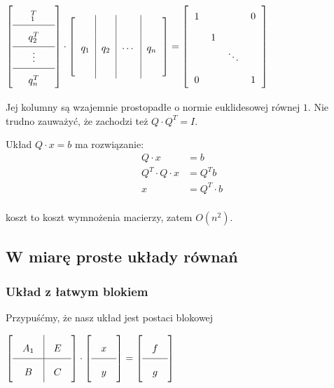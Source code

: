\documentclass[hidelinks,a4paper]{article}
\newcommand{\eye}{I}
\begin{document}
$\arraycolsep=0.6em\def\arraystretch{1.8}
\left[
	\begin{array}{c}
		\quad _1^T \quad   \\ \hline
		\quad q_2^T \quad  \\ \hline
		\quad \vdots \quad \\ \hline
		\quad q_n^T \quad  
	\end{array}
\right]
\cdot
\left[
	\begin{array}{c|c|c|c}
		    &     &        &     \\
		q_1 & q_2 & \cdots & q_n \\
		    &     &        &     
	\end{array}
\right]
=
\left[
	\begin{array}{cccc}
		1 &   &        & 0 \\
		  & 1 &        &   \\
		  &   & \ddots &   \\
		0 &   &        & 1 
	\end{array}
\right]	
$

Jej kolumny są wzajemnie prostopadłe o normie euklidesowej równej $1$. Nie trudno zauważyć, że zachodzi też $Q \cdot Q^T = \eye$.

Układ $Q \cdot x = b$ ma rozwiązanie:
\begin{equation}
	\begin{aligned}
		Q \cdot x           & = b           \\
		Q^T \cdot Q \cdot x & = Q^T b       \\
		x                   & = Q^T \cdot b \\
	\end{aligned}
\end{equation}

koszt to koszt wymnożenia macierzy, zatem  $O(n^2)$.


\subsection{W miarę proste układy równań}

\subsubsection{Układ z łatwym blokiem}

Przypuśćmy, że nasz układ jest postaci blokowej

$\arraycolsep=1em\def\arraystretch{2}
\left[
	\begin{array}{c|c}
		A_1 & E \\ \hline
		B   & C 
	\end{array}
\right] \cdot
\left[
	\begin{array}{c}
		x \\ \hline
		y 
	\end{array}
\right] = 
\left[
	\begin{array}{c}
		f \\ \hline
		g 
	\end{array}
\right]
$
\end{document}
